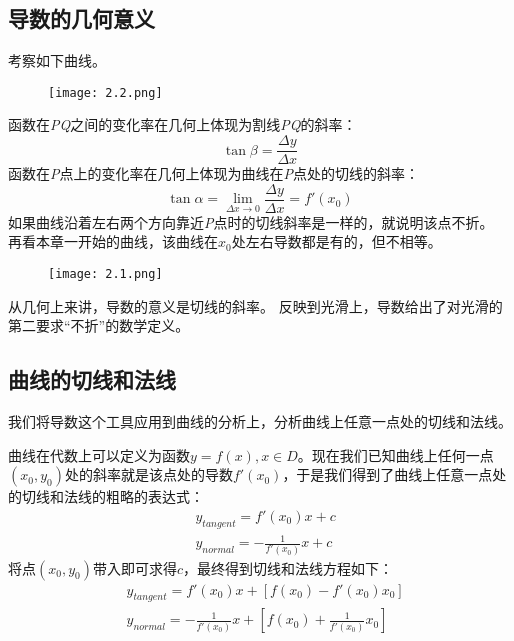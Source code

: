 \subsection{导数的几何意义}

考察如下曲线。
\begin{figure}[h]
\centering
\texttt{[image: 2.2.png]}
\end{figure}

函数在{\it PQ}之间的变化率在几何上体现为割线{\it PQ}的斜率：
\[
\tan \beta =\frac{\Delta y}{\Delta x}
\]
函数在{\it P}点上的变化率在几何上体现为曲线在{\it P}点处的切线的斜率：
\[
\tan \alpha =\underset{\Delta x\rightarrow 0}{\lim}\frac{\Delta y}{\Delta x}=f'\left( x_0 \right)
\]
如果曲线沿着左右两个方向靠近{\it P}点时的切线斜率是一样的，就说明该点不折。
再看本章一开始的曲线，该曲线在$x_0$处左右导数都是有的，但不相等。
\begin{figure}[ht]
\centering
\texttt{[image: 2.1.png]}
\end{figure}

从几何上来讲，导数的意义是切线的斜率。
反映到光滑上，导数给出了对光滑的第二要求“不折”的数学定义。

\subsection{曲线的切线和法线}

我们将导数这个工具应用到曲线的分析上，分析曲线上任意一点处的切线和法线。

曲线在代数上可以定义为函数$y=f\left( x \right) ,x\in D$。现在我们已知曲线上任何一点$\left( x_0,y_0 \right) $处的斜率就是该点处的导数$f'\left( x_0 \right) $，于是我们得到了曲线上任意一点处的切线和法线的粗略的表达式：
\begin{align*}
&y_{tangent}=f'\left( x_0 \right) x+c \\
&y_{normal}=-\frac{1}{f'\left( x_0 \right)}x+c
\end{align*}
将点$\left( x_0,y_0 \right) $带入即可求得$c$，最终得到切线和法线方程如下：
\begin{align*}
&y_{tangent}=f'\left( x_0 \right) x+\left[ f\left( x_0 \right) -f'\left( x_0 \right) x_0 \right] \\
&y_{normal}=-\frac{1}{f'\left( x_0 \right)}x+\left[ f\left( x_0 \right) +\frac{1}{f'\left( x_0 \right)}x_0 \right]
\end{align*}

